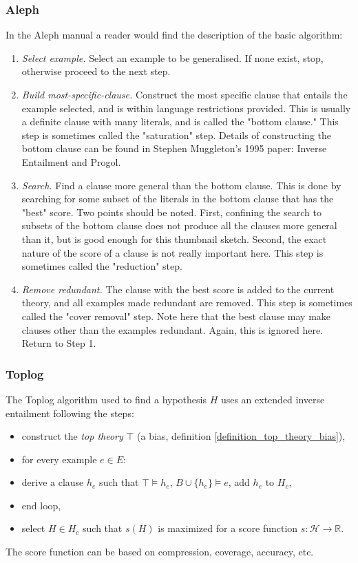 \subsubsection{Aleph}
In the Aleph manual\cite{aleph2007} a reader would find the description of the basic algorithm:
\begin{enumerate}
\item \emph{Select example.} Select an example to be generalised. If none exist, stop, otherwise proceed to the next step.
\item \emph{Build most-specific-clause.} Construct the most specific clause that entails the example selected, and is within language restrictions provided. This is usually a definite clause with many literals, and is called the "bottom clause." This step is sometimes called the "saturation" step. Details of constructing the bottom clause can be found in Stephen Muggleton's 1995 paper: Inverse Entailment and Progol\cite{muggleton1995inverse}.
\item \emph{Search.} Find a clause more general than the bottom clause. This is done by searching for some subset of the literals in the bottom clause that has the "best" score. Two points should be noted. First, confining the search to subsets of the bottom clause does not produce all the clauses more general than it, but is good enough for this thumbnail sketch. Second, the exact nature of the score of a clause is not really important here. This step is sometimes called the "reduction" step.
\item \emph{Remove redundant.} The clause with the best score is added to the current theory, and all examples made redundant are removed. This step is sometimes called the "cover removal" step. Note here that the best clause may make clauses other than the examples redundant. Again, this is ignored here. Return to Step 1.
\end{enumerate}

\subsubsection{Toplog\cite{muggleton2008toplog}\cite{corapi2011nonmonotonic}}
The Toplog algorithm used to find a hypothesis $H$ uses an extended inverse entailment following the steps:

\begin{itemize}
\item construct the \emph{top theory} $\top$ (a bias, definition \ref{definition_top_theory_bias}),
\item for every example $e \in E$:
\item derive a clause $h_e$ such that $\top \models h_e$, $B \cup \{h_e\} \models e$, add $h_e$ to $H_c$,
\item end loop,
\item select $H \in H_c$ such that $s(H)$ is maximized for a score function $s:\mathcal{H} \to \mathbb{R}$.
\end{itemize}
The score function can be based on compression, coverage, accuracy, etc.

